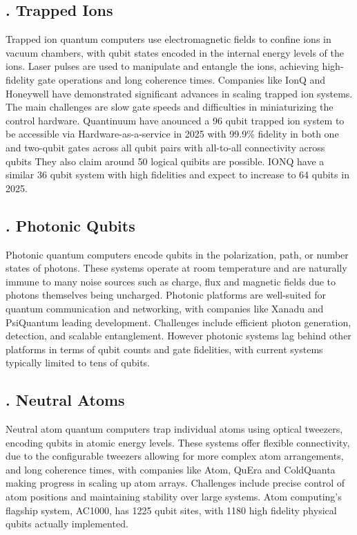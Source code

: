 \documentclass{elbioimp2}
\begin{document}
\subsection{. Trapped Ions}
Trapped ion quantum computers use electromagnetic fields to confine ions in vacuum chambers, with qubit states encoded in the internal energy levels of the ions. Laser pulses are used to manipulate and entangle the ions, achieving high-fidelity gate operations and long coherence times. Companies like IonQ and Honeywell have demonstrated significant advances in scaling trapped ion systems. The main challenges are slow gate speeds and difficulties in miniaturizing the control hardware. Quantinuum have  anounced a 96 qubit trapped ion system to be accessible via Hardware-as-a-service in 2025\cite{quantinuum2025} with 99.9\% fidelity in both one and two-qubit gates across all qubit pairs with all-to-all connectivity across qubits They also claim around 50 logical quibits are possible. IONQ have a similar 36 qubit system with high fidelities and expect to increase to 64 qubits in 2025\cite{IonQ2025}.

\subsection{. Photonic Qubits}
Photonic quantum computers encode qubits in the polarization, path, or number states of photons. These systems operate at room temperature and are naturally immune to many noise sources such as charge, flux and magnetic fields due to photons themselves being uncharged. Photonic platforms are well-suited for quantum communication and networking, with companies like Xanadu and PsiQuantum leading development. Challenges include efficient photon generation, detection, and scalable entanglement. However photonic systems lag behind other platforms in terms of qubit counts and gate fidelities, with current systems typically limited to tens of qubits.

\subsection{. Neutral Atoms}
Neutral atom quantum computers trap individual atoms using optical tweezers, encoding qubits in atomic energy levels. These systems offer flexible connectivity, due to the configurable tweezers allowing for more complex atom arrangements, and long coherence times, with companies like Atom, QuEra and ColdQuanta making progress in scaling up atom arrays. Challenges include precise control of atom positions and maintaining stability over large systems. Atom computing's flagship system, AC1000, has 1225 qubit sites, with 1180 high fidelity physical qubits actually implemented\cite{atom2023}.
\end{document}
